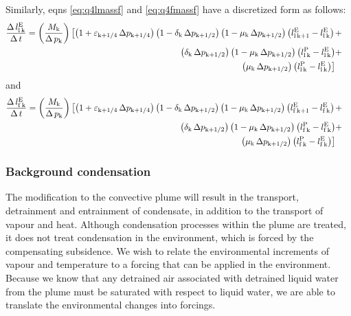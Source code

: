 \documentclass{UMDP_article}
\newcommand{\lsubsup}[2]{\ensuremath{l_{\rm{#1}}^{\rm{#2}}}}
\newcommand{\lc}{\left[}
\newcommand{\rc}{\right]}
\newcommand{\lp}{\left(}
\newcommand{\rp}{\right)}
\begin{document}
Similarly, eqns \ref{eq:q4lmassf} and \ref{eq:q4fmassf} have
a discretized form as follows: 
%
\begin{eqnarray}
\frac{\Delta \, \lsubsup{l \, k}{E}}{\Delta \, t} = 
\lp \frac{ M_{\rm{k}} }{ \Delta \, p_{\rm{k}} } \rp 
\lc {
\lp { 1 + \varepsilon_{\rm{k} + 1 / 4} \, \Delta p_{\rm{k} + 1 / 4} } \rp
\lp { 1 - \delta_{\rm{k}} \, \Delta p_{\rm{k} + 1 / 2} } \rp
\lp { 1 - \mu_{\rm{k}} \, \Delta p_{\rm{k} + 1 / 2} } \rp 
\lp { \lsubsup{l \, k + 1}{E} - \lsubsup{l \, k}{E} } \rp 
} \right . & + &  \nonumber \\
\lp { \delta_{\rm{k}} \, \Delta p_{\rm{k} + 1 / 2} } \rp
\lp { 1 - \mu_{\rm{k}} \, \Delta p_{\rm{k} + 1 / 2} } \rp 
\lp { \lsubsup{l \, k}{P} - \lsubsup{l \, k}{E} } \rp 
& + &  \nonumber \\
\left . {
\lp { \mu_{\rm{k}} \, \Delta p_{\rm{k} + 1 / 2} } \rp 
\lp { \lsubsup{l \, k}{P} - \lsubsup{l \, k}{E} } \rp 
} \rc & { } &  \label{eq:enviroll}
\end{eqnarray}
%
and 
%
\begin{eqnarray}
\frac{\Delta \, \lsubsup{f \, k}{E}}{\Delta \, t} = 
\lp \frac{ M_{\rm{k}} }{ \Delta \, p_{\rm{k}} } \rp 
\lc {
\lp { 1 + \varepsilon_{\rm{k} + 1 / 4} \, \Delta p_{\rm{k} + 1 / 4} } \rp
\lp { 1 - \delta_{\rm{k}} \, \Delta p_{\rm{k} + 1 / 2} } \rp
\lp { 1 - \mu_{\rm{k}} \, \Delta p_{\rm{k} + 1 / 2} } \rp 
\lp { \lsubsup{f \, k + 1}{E} - \lsubsup{f \, k}{E} } \rp 
} \right . & + &  \nonumber \\
\lp { \delta_{\rm{k}} \, \Delta p_{\rm{k} + 1 / 2} } \rp
\lp { 1 - \mu_{\rm{k}} \, \Delta p_{\rm{k} + 1 / 2} } \rp 
\lp { \lsubsup{f \, k}{P} - \lsubsup{f \, k}{E} } \rp 
& + &  \nonumber \\
\left . {
\lp { \mu_{\rm{k}} \, \Delta p_{\rm{k} + 1 / 2} } \rp 
\lp { \lsubsup{f \, k }{P} - \lsubsup{f \, k}{E} } \rp 
} \rc & { } &  \label{eq:envirolf}
\end{eqnarray}

\subsubsection{Background condensation}
\label{sec:conv_homog}
The modification to the convective plume will result in the transport,
detrainment and entrainment of condensate, in addition to the
transport of vapour and heat. Although condensation processes within
the plume are treated, it does not treat condensation in the
environment, which is forced by the compensating subsidence. We wish
to relate the environmental increments of vapour and temperature
to a forcing that can be applied in the environment. Because we
know that any detrained air associated with detrained liquid water
from the plume must be saturated with respect to liquid water, we
are able to translate the environmental changes into forcings.
\end{document}
